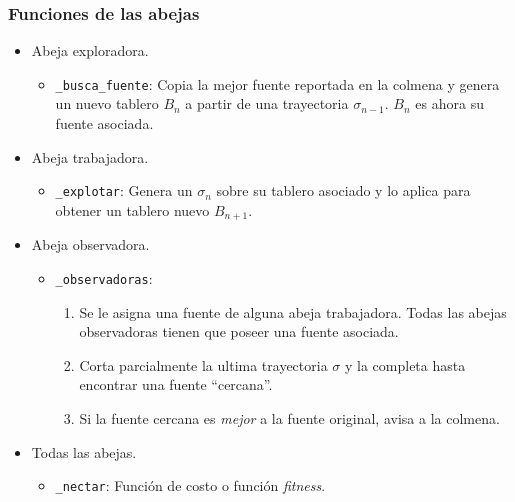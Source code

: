 \begin{frame}
\frametitle{Funciones de las abejas}
\begin{itemize}
\item Abeja exploradora.
\begin{itemize}
\item \texttt{\_busca\_fuente}: Copia la mejor fuente reportada en la colmena y genera un nuevo tablero $B_{n}$ a partir de una trayectoria $\sigma_{n-1}$. $B_{n}$ es ahora su fuente asociada.
\end{itemize}
\pause

\item Abeja trabajadora.
\begin{itemize}
\item \texttt{\_explotar}: Genera un $\sigma_{n}$ sobre su tablero asociado y lo aplica para obtener un tablero nuevo $B_{n+1}$.
\end{itemize}
\pause

\item Abeja observadora.
\begin{itemize}
\item \texttt{\_observadoras}: 
\begin{enumerate}
 \item Se le asigna una fuente de alguna abeja trabajadora. Todas las abejas observadoras tienen que poseer una fuente asociada.
 \item Corta parcialmente la ultima trayectoria $\sigma$ y la completa hasta encontrar una fuente ``cercana''.
 \item Si la fuente cercana es \textit{mejor} a la fuente original, avisa a la colmena. 
\end{enumerate}
\end{itemize}
\pause
\item Todas las abejas.
\begin{itemize}
\item \texttt{\_nectar}: Función de costo o función \textit{fitness}.
\end{itemize}
\end{itemize}
\end{frame}



